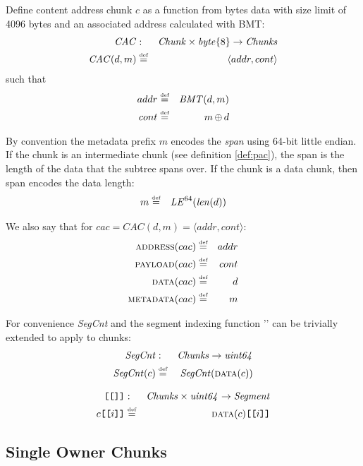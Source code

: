 \begin{definition}
\label{def:cac}
Define content address chunk $c$ as a function from bytes data with size limit of 4096 bytes and an associated address calculated with BMT:
% 
\begin{eqnarray}
\mathit{CAC} &:& \mathit{Chunk}\times\mathit{byte}\{8\}\to\mathit{Chunks}\\
\mathit{CAC}(d,m)&\overset{\textrm{\tiny def}}{=}&\langle addr,cont\rangle
\end{eqnarray}
%
such that
%
\begin{eqnarray}
addr&\overset{\textrm{\tiny def}}{=}&\mathit{BMT}(d,m)\\
cont&\overset{\textrm{\tiny def}}{=}&m\operatorname{\operatorname{\oplus}} d
\end{eqnarray}


By convention the metadata prefix $m$ encodes the \emph{span} using 64-bit little endian. If the chunk is an intermediate chunk (see definition \ref{def:pac}), the span is the length of the data that the subtree spans over. If the chunk is a data chunk, then span encodes the data length:
%
\begin{eqnarray}
m&\overset{\textrm{\tiny def}}{=}& \mathit{LE}^{64}(\mathit{len}(d))
\end{eqnarray}

We also say that for $cac = \mathit{CAC}(d,m) = \langle addr,cont\rangle$:
%
\begin{eqnarray}
\textsc{address}(cac)&\overset{\textrm{\tiny def}}{=}&addr\\
\textsc{payload}(cac)&\overset{\textrm{\tiny def}}{=}&cont\\
\textsc{data}(cac)&\overset{\textrm{\tiny def}}{=}& d\\
\textsc{metadata}(cac)&\overset{\textrm{\tiny def}}{=}& m
\end{eqnarray}

For convenience \emph{SegCnt} and the segment indexing function '\idx{\idx{}}' can be trivially extended to apply to chunks:
%
\begin{eqnarray}
\mathit{SegCnt}&:&\mathit{Chunks}\to\mathit{uint64}\\
\mathit{SegCnt}(c)&\overset{\textrm{\tiny def}}{=}&\mathit{SegCnt}(\textsc{data}(c))
\end{eqnarray}

\begin{eqnarray}
\texttt{[}\/\texttt{[}\/\/\texttt{]}\/\texttt{]}&:&\mathit{Chunks}\times\mathit{uint64}\to\mathit{Segment}\\
c\texttt{[}\/\texttt{[}\/i\/\texttt{]}\/\texttt{]}&\overset{\textrm{\tiny def}}{=}&\textsc{data}(c)\texttt{[}\/\texttt{[}\/i\/\texttt{]}\/\texttt{]}
\end{eqnarray}
\end{definition}

\subsection{Single Owner Chunks}

